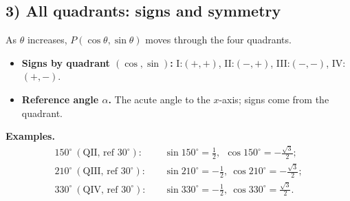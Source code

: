 \documentclass{article}
\begin{document}
\subsection*{3) All quadrants: signs and symmetry}
As \(\theta\) increases, \(P(\cos\theta,\sin\theta)\) moves through the four quadrants.
\begin{itemize}[leftmargin=0.7cm]
  \item \textbf{Signs by quadrant \((\cos,\sin)\):} I:\((+,+)\), II:\((-,+)\), III:\((-,-)\), IV:\((+,-)\).
  \item \textbf{Reference angle \(\alpha\).} The acute angle to the $x$-axis; signs come from the quadrant.
\end{itemize}
\textbf{Examples.}
\[
\begin{aligned}
150^\circ \ (\text{QII, ref }30^\circ):&\quad \sin150^\circ=\tfrac12,\ \ \cos150^\circ=-\tfrac{\sqrt3}{2};\\
210^\circ \ (\text{QIII, ref }30^\circ):&\quad \sin210^\circ=-\tfrac12,\ \cos210^\circ=-\tfrac{\sqrt3}{2};\\
330^\circ \ (\text{QIV, ref }30^\circ):&\quad \sin330^\circ=-\tfrac12,\ \cos330^\circ=\tfrac{\sqrt3}{2}.
\end{aligned}
\]
\end{document}
